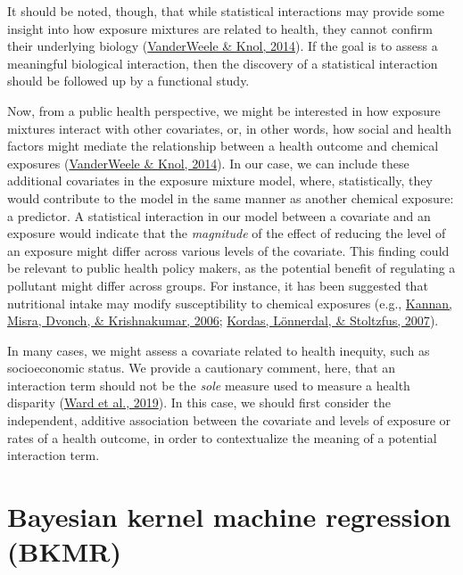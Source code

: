 \documentclass[12pt, twoside]{amherstthesis}
\begin{document}
It should be noted, though, that while statistical interactions may provide some insight into how exposure mixtures are related to health, they cannot confirm their underlying biology (\protect\hyperlink{ref-vanderweele_tutorial_2014}{VanderWeele \& Knol, 2014}). If the goal is to assess a meaningful biological interaction, then the discovery of a statistical interaction should be followed up by a functional study.

Now, from a public health perspective, we might be interested in how exposure mixtures interact with other covariates, or, in other words, how social and health factors might mediate the relationship between a health outcome and chemical exposures (\protect\hyperlink{ref-vanderweele_tutorial_2014}{VanderWeele \& Knol, 2014}). In our case, we can include these additional covariates in the exposure mixture model, where, statistically, they would contribute to the model in the same manner as another chemical exposure: a predictor. A statistical interaction in our model between a covariate and an exposure would indicate that the \emph{magnitude} of the effect of reducing the level of an exposure might differ across various levels of the covariate. This finding could be relevant to public health policy makers, as the potential benefit of regulating a pollutant might differ across groups. For instance, it has been suggested that nutritional intake may modify susceptibility to chemical exposures (e.g., \protect\hyperlink{ref-kannan_exposures_2006}{Kannan, Misra, Dvonch, \& Krishnakumar, 2006}; \protect\hyperlink{ref-kordas_interactions_2007}{Kordas, Lönnerdal, \& Stoltzfus, 2007}).

In many cases, we might assess a covariate related to health inequity, such as socioeconomic status. We provide a cautionary comment, here, that an interaction term should not be the \emph{sole} measure used to measure a health disparity (\protect\hyperlink{ref-ward_how_2019}{Ward et al., 2019}). In this case, we should first consider the independent, additive association between the covariate and levels of exposure or rates of a health outcome, in order to contextualize the meaning of a potential interaction term.

\hypertarget{bkmr}{%
\section{Bayesian kernel machine regression (BKMR)}\label{bkmr}}
\end{document}
